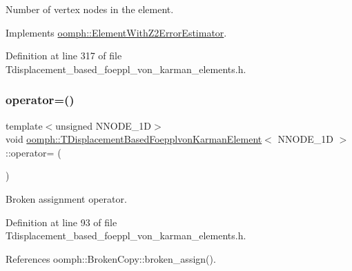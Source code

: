 Number of vertex nodes in the element. 



Implements \hyperlink{classoomph_1_1ElementWithZ2ErrorEstimator_a19495a0e77ef4ff35f15fdf7913b4077}{oomph\+::\+Element\+With\+Z2\+Error\+Estimator}.



Definition at line 317 of file Tdisplacement\+\_\+based\+\_\+foeppl\+\_\+von\+\_\+karman\+\_\+elements.\+h.

\mbox{\label{classoomph_1_1TDisplacementBasedFoepplvonKarmanElement_a79316486291f8ab93115411901fe49a4}} 
\subsubsection{\texorpdfstring{operator=()}{operator=()}}
{\footnotesize\ttfamily template$<$unsigned N\+N\+O\+D\+E\+\_\+1D$>$ \\
void \hyperlink{classoomph_1_1TDisplacementBasedFoepplvonKarmanElement}{oomph\+::\+T\+Displacement\+Based\+Foepplvon\+Karman\+Element}$<$ N\+N\+O\+D\+E\+\_\+1D $>$\+::operator= (\begin{DoxyParamCaption}\item[{const \hyperlink{classoomph_1_1TDisplacementBasedFoepplvonKarmanElement}{T\+Displacement\+Based\+Foepplvon\+Karman\+Element}$<$ N\+N\+O\+D\+E\+\_\+1D $>$ \&}]{ }\end{DoxyParamCaption})\hspace{0.3cm}{\ttfamily [inline]}}



Broken assignment operator. 



Definition at line 93 of file Tdisplacement\+\_\+based\+\_\+foeppl\+\_\+von\+\_\+karman\+\_\+elements.\+h.



References oomph\+::\+Broken\+Copy\+::broken\+\_\+assign().

\mbox{\label{classoomph_1_1TDisplacementBasedFoepplvonKarmanElement_a1c3ad1317dc48f704d6d012a9c50724e}} 
